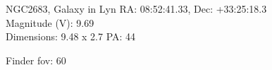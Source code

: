 \begin{block}{NGC2683, Galaxy in Lyn}
    RA: 08:52:41.33, Dec: +33:25:18.3 \\ 
    Magnitude (V): 9.69 \\ 
    Dimensions: 9.48 x 2.7 PA: 44 

    Finder fov: 60 
\end{block}